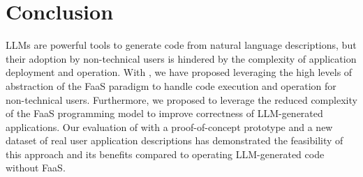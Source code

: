 \section{Conclusion}
\label{sec:conclusion}

LLMs are powerful tools to generate code from natural language descriptions, but their adoption by non-technical users is hindered by the complexity of application deployment and operation.
With \sysname{}, we have proposed leveraging the high levels of abstraction of the FaaS paradigm to handle code execution and operation for non-technical users.
Furthermore, we proposed to leverage the reduced complexity of the FaaS programming model to improve correctness of LLM-generated applications.
Our evaluation of \sysname{} with a proof-of-concept prototype and a new dataset of real user application descriptions has demonstrated the feasibility of this approach and its benefits compared to operating LLM-generated code without FaaS.
